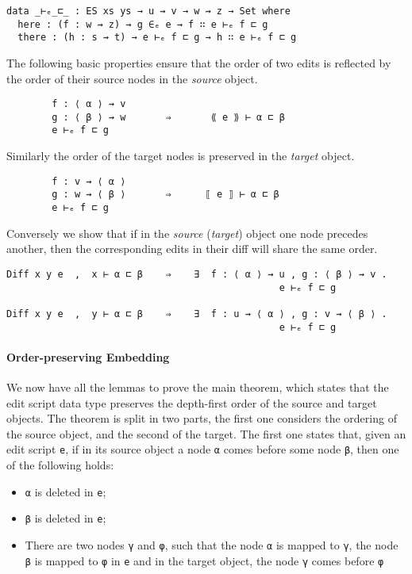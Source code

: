 \documentclass[preprint]{sigplanconf}
\begin{document}
\begin{verbatim}
data _⊢ₑ_⊏_ : ES xs ys → u ⇝ v → w ⇝ z → Set where
  here : (f : w ⇝ z) → g ∈ₑ e → f ∷ e ⊢ₑ f ⊏ g 
  there : (h : s ⇝ t) → e ⊢ₑ f ⊏ g → h ∷ e ⊢ₑ f ⊏ g 
\end{verbatim}

    The following basic properties ensure that the order of two edits 
    is reflected by the order of their source nodes in the \emph{source} object.
\begin{verbatim}
        f : ⟨ α ⟩ ⇝ v 
        g : ⟨ β ⟩ ⇝ w       ⇒       ⟪ e ⟫ ⊢ α ⊏ β
        e ⊢ₑ f ⊏ g 
\end{verbatim}
    Similarly the order of the target nodes is preserved in the \emph{target} 
    object.    

\begin{verbatim}
        f : v ⇝ ⟨ α ⟩
        g : w ⇝ ⟨ β ⟩       ⇒      ⟦ e ⟧ ⊢ α ⊏ β
        e ⊢ₑ f ⊏ g
\end{verbatim}

    Conversely we show that if in the \emph{source} (\emph{target}) 
    object one node precedes another, then the corresponding edits in their diff 
    will share the same order.
\begin{verbatim}
Diff x y e  ,  x ⊢ α ⊏ β    ⇒    ∃  f : ⟨ α ⟩ ⇝ u , g : ⟨ β ⟩ ⇝ v . 
                                                e ⊢ₑ f ⊏ g

Diff x y e  ,  y ⊢ α ⊏ β    ⇒    ∃  f : u ⇝ ⟨ α ⟩ , g : v ⇝ ⟨ β ⟩ . 
                                                e ⊢ₑ f ⊏ g
\end{verbatim}

    \paragraph{Order-preserving Embedding}
    We now have all the lemmas to prove the main theorem, 
    which states that the edit script data type preserves the depth-first order of
    the source and target objects.
    The theorem is split in two parts, the first one considers 
    the ordering of the source object, and the second of the target.
    The first one states that, given an edit script \texttt{e}, 
    if in its source object a node \texttt{α} comes before
    some node \texttt{β}, then one of the following holds:
    \begin{itemize}
    \item \texttt{α} is deleted in \texttt{e};
    \item \texttt{β} is deleted in \texttt{e};
    \item There are two nodes \texttt{γ} and \texttt{φ}, such that the node 
    \texttt{α} is 	mapped to \texttt{γ}, the node \texttt{β} is mapped to 
    \texttt{φ} in \texttt{e} and 
    in the target	object, the node \texttt{γ} comes before \texttt{φ}
    \end{itemize}
\end{document}
